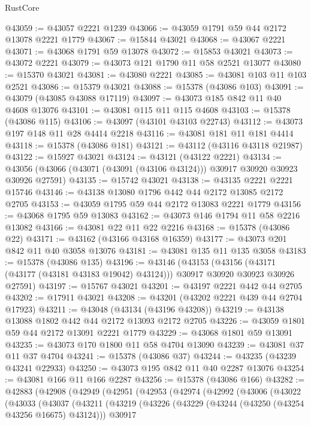 \begin{lexlean}{RustCore}
\begin{coremodule}
@43059 := @43057 @2221 @1239
@43066 := @43059 @1791 @59 @44 @2172 @13078 @2221 @1779
@43067 := @15844 @43021
@43068 := @43067 @2221
@43071 := @43068 @1791 @59 @13078
@43072 := @15853 @43021
@43073 := @43072 @2221
@43079 := @43073 @121 @1790 @11 @58 @2521 @13077
@43080 := @15370 @43021
@43081 := @43080 @2221
@43085 := @43081 @103 @11 @103 @2521
@43086 := @15379 @43021
@43088 := @15378 (@43086 @103)
@43091 := @43079 (@43085 @43088 @17119)
@43097 := @43073 @185 @842 @11 @40 @4608 @13076
@43101 := @43081 @115 @11 @115 @4608
@43103 := @15378 (@43086 @115)
@43106 := @43097 (@43101 @43103 @22743)
@43112 := @43073 @197 @148 @11 @28 @4414 @2218
@43116 := @43081 @181 @11 @181 @4414
@43118 := @15378 (@43086 @181)
@43121 := @43112 (@43116 @43118 @21987)
@43122 := @15927 @43021
@43124 := @43121 (@43122 @2221)
@43134 := @43056 (@43066 (@43071 (@43091 (@43106 @43124))) @30917 @30920 @30923 @30926 @27591)
@43135 := @15742 @43021
@43138 := @43135 @2221 @2221 @15746
@43146 := @43138 @13080 @1796 @442 @44 @2172 @13085 @2172 @2705
@43153 := @43059 @1795 @59 @44 @2172 @13083 @2221 @1779
@43156 := @43068 @1795 @59 @13083
@43162 := @43073 @146 @1794 @11 @58 @2216 @13082
@43166 := @43081 @22 @11 @22 @2216
@43168 := @15378 (@43086 @22)
@43171 := @43162 (@43166 @43168 @16359)
@43177 := @43073 @201 @842 @11 @40 @3058 @13076
@43181 := @43081 @135 @11 @135 @3058
@43183 := @15378 (@43086 @135)
@43196 := @43146
    (@43153
      (@43156 (@43171 (@43177 (@43181 @43183 @19042) @43124)))
      @30917
      @30920
      @30923
      @30926
      @27591)
@43197 := @15767 @43021
@43201 := @43197 @2221 @442 @44 @2705
@43202 := @17911 @43021
@43208 := @43201 (@43202 @2221 @439 @44 @2704 @17923)
@43211 := @43048 (@43134 (@43196 @43208))
@43219 := @43138 @13088 @1802 @442 @44 @2172 @13093 @2172 @2705
@43226 := @43059 @1801 @59 @44 @2172 @13091 @2221 @1779
@43229 := @43068 @1801 @59 @13091
@43235 := @43073 @170 @1800 @11 @58 @4704 @13090
@43239 := @43081 @37 @11 @37 @4704
@43241 := @15378 (@43086 @37)
@43244 := @43235 (@43239 @43241 @22933)
@43250 := @43073 @195 @842 @11 @40 @2287 @13076
@43254 := @43081 @166 @11 @166 @2287
@43256 := @15378 (@43086 @166)
@43282 := @42883
    (@42908
      (@42949
        (@42951
          (@42953
            (@42974
              (@42992
                (@43006
                  (@43022
                    (@43033
                      (@43037
                        (@43211
                          (@43219
                            (@43226
                              (@43229 (@43244 (@43250 (@43254 @43256 @16675) @43124)))
                              @30917

\end{coremodule}
\end{lexlean}
